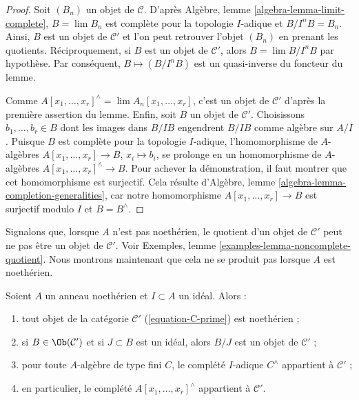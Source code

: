 \begin{proof}
Soit $(B_n)$ un objet de $\mathcal{C}$. D'après
Algèbre, lemme \ref{algebra-lemma-limit-complete},
$B = \lim B_n$ est complète pour la topologie $I$-adique et
$B/I^nB = B_n$. Ainsi, $B$ est un objet de $\mathcal{C}'$ et l'on peut
retrouver l'objet $(B_n)$ en prenant les quotients. Réciproquement, si $B$ est
un objet de $\mathcal{C}'$, alors $B = \lim B/I^nB$ par hypothèse. Par
conséquent, $B \mapsto (B/I^nB)$ est un quasi-inverse du foncteur du lemme.

\medskip\noindent
Comme $A[x_1, \ldots, x_r]^\wedge = \lim A_n[x_1, \ldots, x_r]$,
c'est un objet de $\mathcal{C}'$ d'après la première assertion du lemme.
Enfin, soit $B$ un objet de $\mathcal{C}'$. Choisissons
$b_1, \ldots, b_r \in B$ dont les images dans $B/IB$ engendrent $B/IB$
comme algèbre sur $A/I$. Puisque $B$ est complète pour la topologie
$I$-adique, l'homomorphisme de $A$-algèbres
$A[x_1, \ldots, x_r] \to B$, $x_i \mapsto b_i$, se prolonge en un
homomorphisme de $A$-algèbres $A[x_1, \ldots, x_r]^\wedge \to B$.
Pour achever la démonstration, il faut montrer que cet homomorphisme est
surjectif. Cela résulte d'Algèbre, lemme
\ref{algebra-lemma-completion-generalities}, car notre homomorphisme
$A[x_1, \ldots, x_r] \to B$ est surjectif modulo $I$ et $B = B^\wedge$.
\end{proof}

\noindent
Signalons que, lorsque $A$ n'est pas noethérien, le quotient d'un objet de
$\mathcal{C}'$ peut ne pas être un objet de $\mathcal{C}'$. Voir Exemples,
lemme \ref{examples-lemma-noncomplete-quotient}. Nous montrons maintenant que
cela ne se produit pas lorsque $A$ est noethérien.

\begin{lemma}
\label{lemma-topologically-finite-type-Noetherian}
\begin{reference}
\cite[Proposition 7.5.5]{EGA1}
\end{reference}
Soient $A$ un anneau noethérien et $I \subset A$ un idéal. Alors :
\begin{enumerate}
\item tout objet de la catégorie $\mathcal{C}'$
(\ref{equation-C-prime}) est noethérien ;
\item si $B \in \Ob(\mathcal{C}')$ et si $J \subset B$ est un idéal,
alors $B/J$ est un objet de $\mathcal{C}'$ ;
\item pour toute $A$-algèbre de type fini $C$, le complété $I$-adique
$C^\wedge$ appartient à $\mathcal{C}'$ ;
\item en particulier, le complété $A[x_1, \ldots, x_r]^\wedge$
appartient à $\mathcal{C}'$.
\end{enumerate}
\end{lemma}


